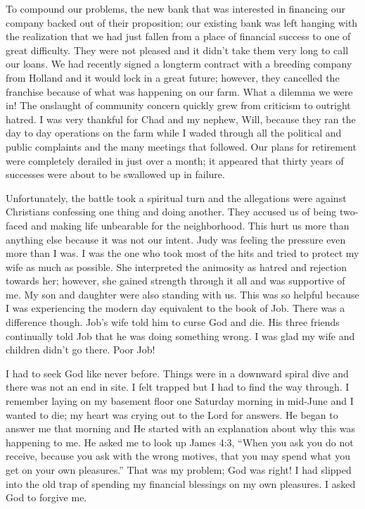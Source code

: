 \documentclass[oneside]{book}
\begin{document}
To compound our problems, the new bank that was interested in financing our company backed out of their proposition; our existing bank was left hanging with the realization that we had just fallen from a place of financial success to one of great difficulty. They were not pleased and it didn’t take them very long to call our loans. We had recently signed a longterm contract with a breeding company from Holland and it would lock in a great future; however, they cancelled the franchise because of what was happening on our farm. What a dilemma we were in! The onslaught of community concern quickly grew from criticism to outright hatred. I was very thankful for Chad and my nephew, Will, because they ran the day to day operations on the farm while I waded through all the political and public complaints and the many meetings that followed. Our plans for retirement were completely derailed in just over a month; it appeared that thirty years of successes were about to be swallowed up in failure.

Unfortunately, the battle took a spiritual turn and the allegations were against Christians confessing one thing and doing another. They accused us of being two-faced and making life unbearable for the neighborhood. This hurt us more than anything else because it was not our intent. Judy was feeling the pressure even more than I was. I was the one who took most of the hits and tried to protect my wife as much as possible. She interpreted the animosity as hatred and rejection towards her; however, she gained strength through it all and was supportive of me. My son and daughter were also standing with us. This was so helpful because I was experiencing the modern day equivalent to the book of Job. There was a difference though. Job’s wife told him to curse God and die. His three friends continually told Job that he was doing something wrong. I was glad my wife and children didn't go there. Poor Job!


I had to seek God like never before. Things were in a downward spiral dive and there was not an end in site. I felt trapped but I had to find the way through. I remember laying on my basement floor one Saturday morning in mid-June and I wanted to die; my heart was crying out to the Lord for answers. He began to answer me that morning and He started with an explanation about why this was happening to me. He asked me to look up James 4:3, “When you ask you do not receive, because you ask with the wrong motives, that you may spend what you get on your own pleasures.” That was my problem; God was right! I had slipped into the old trap of spending my financial blessings on my own pleasures. I asked God to forgive me.
\end{document}
